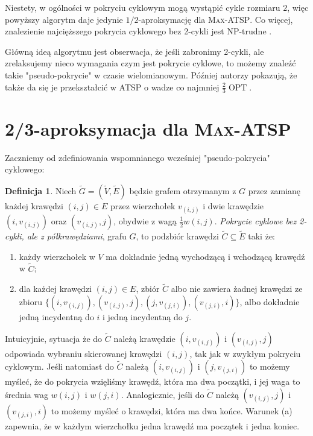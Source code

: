 \documentclass[a4paper,12pt]{article}
\DeclareMathOperator\OPT{OPT}
\theoremstyle{definition}
\newtheorem{definition}{Definicja}
\begin{document}
Niestety, w ogólności w pokryciu cyklowym mogą wystąpić cykle rozmiaru $2$, więc powyższy algorytm daje jedynie $1/2$-aproksymację dla \textsc{Max-ATSP}. Co więcej, znalezienie najcięższego pokrycia cyklowego bez 2-cykli jest NP-trudne \cite{Blaser2002}.

Główną ideą algorytmu \cite{Paluch2012} jest obserwacja, że jeśli zabronimy 2-cykli, ale zrelaksujemy nieco wymagania czym jest pokrycie cyklowe, to możemy znaleźć takie "pseudo-pokrycie" w czasie wielomianowym. Później autorzy pokazują, że także da się je przekształcić w ATSP o wadze co najmniej $\frac{2}{3}\OPT$.

\section{2/3-aproksymacja dla \textsc{Max-ATSP}}

Zaczniemy od zdefiniowania wspomnianego wcześniej "pseudo-pokrycia" cyklowego:

\begin{definition}
  Niech $\tilde{G} = (\tilde{V}, \tilde{E})$ będzie grafem otrzymanym z $G$ przez zamianę każdej krawędzi $(i, j) \in E$ przez wierzchołek $v_{(i,j)}$ i dwie krawędzie $(i, v_{(i,j)})$ oraz $(v_{(i,j)}, j)$, obydwie z wagą $\frac{1}{2}w(i,j)$. \emph{Pokrycie cyklowe bez 2-cykli, ale z półkrawędziami}, grafu $G$, to podzbiór krawędzi $\tilde{C} \subseteq \tilde{E}$ taki że:
  \begin{enumerate}[nosep,label=(\alph*)]
    \item każdy wierzchołek w $V$ ma dokładnie jedną wychodzącą i wchodzącą krawędź w $\tilde{C}$;
    \item dla każdej krawędzi $(i, j) \in E$, zbiór $\tilde{C}$ albo nie zawiera żadnej krawędzi ze zbioru $\{(i, v_{(i,j)}), (v_{(i,j)}, j), (j, v_{(j,i)}), (v_{(j,i)}, i)\}$, albo dokładnie jedną incydentną do $i$ i jedną incydentną do $j$.
  \end{enumerate}
\end{definition}

Intuicyjnie, sytuacja że do $\tilde{C}$ należą krawędzie $(i, v_{(i,j)})$ i $(v_{(i,j)}, j)$ odpowiada wybraniu skierowanej krawędzi $(i, j)$, tak jak w zwykłym pokryciu cyklowym. Jeśli natomiast do $\tilde{C}$ należą $(i, v_{(i,j)})$ i $(j, v_{(j,i)})$ to możemy myśleć, że do pokrycia wzięliśmy krawędź, która ma dwa początki, i jej waga to średnia wag $w(i,j)$ i $w(j,i)$. Analogicznie, jeśli do $\tilde{C}$ należą $(v_{(i,j)}, j)$ i $(v_{(j,i)}, i)$ to możemy myśleć o krawędzi, która ma dwa końce. Warunek (a) zapewnia, że w każdym wierzchołku jedna krawędź ma początek i jedna koniec.
\end{document}
